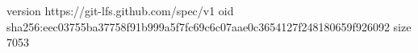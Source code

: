 version https://git-lfs.github.com/spec/v1
oid sha256:eec03755ba37758f91b999a5f7fc69c6c07aae0c3654127f248180659f926092
size 7053
